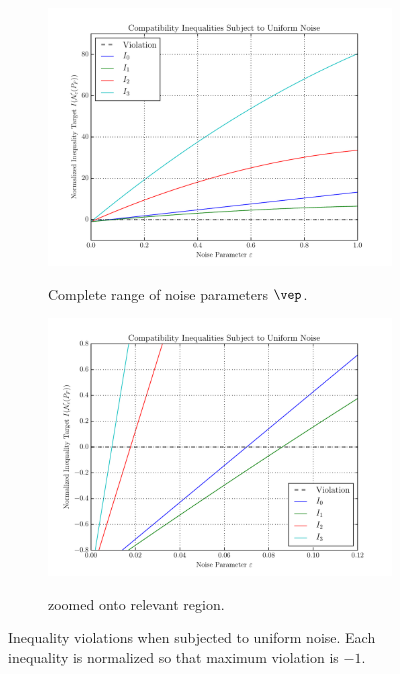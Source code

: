 \documentclass[aps, 10pt, english, twoside, pra, nofootinbib, tightenlines, longbibliography, superscriptaddress]{revtex4-1}
\begin{document}
    \begin{figure}
    \begin{subfigure}[b]{.48\linewidth}
    {\centering\includegraphics[width=\linewidth]{../../figures/noise/noise_2017.pdf}}
    \caption{Complete range of noise parameters $\vep$.}\label{fig:noise}
    \end{subfigure}
    \begin{subfigure}[b]{.48\linewidth}
    {\centering\includegraphics[width=\linewidth]{../../figures/noise/noise_2017_lims.pdf}}
    \caption{ zoomed onto relevant region.}\label{fig:noise_zoomed}
    \end{subfigure}
    \caption{Inequality violations when subjected to uniform noise. Each inequality is normalized so that maximum violation is $-1$.}\label{fig:master_noise}
    \end{figure}
\end{document}
